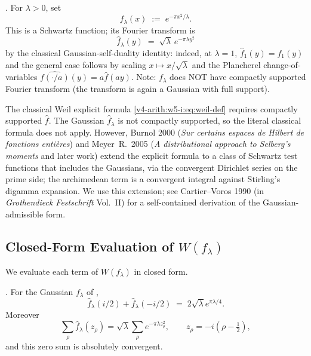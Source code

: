\begin{definition}
\label{v4-arith:w5-i:def:gaussian-family}
\ClaimStatusDefinitional. For \(\lambda>0\), set
\begin{equation}
\label{v4-arith:w5-i:eq:f-lambda}
f_{\lambda}(x)\;:=\;e^{-\pi x^{2}/\lambda}.
\end{equation}
This is a Schwartz function; its Fourier transform is
\begin{equation}
\label{v4-arith:w5-i:eq:f-lambda-hat}
\widehat{f}_{\lambda}(y)\;=\;\sqrt{\lambda}\,e^{-\pi\lambda y^{2}}
\end{equation}
by the classical Gaussian-self-duality identity: indeed, at
\(\lambda=1\), \(\widehat{f}_{1}(y)=f_{1}(y)\) and the general case
follows by scaling \(x\mapsto x/\sqrt{\lambda}\) and the Plancherel
change-of-variables \(\widehat{f(\cdot/a)}(y)=a\widehat{f}(ay)\).
Note: \(f_{\lambda}\) does NOT have compactly supported Fourier
transform (the transform is again a Gaussian with full support).
\end{definition}

\begin{remark}
\label{v4-arith:w5-i:rem:gauss-admissibility}
The classical Weil explicit formula \eqref{v4-arith:w5-i:eq:weil-def}
requires compactly supported \(\widehat{f}\). The Gaussian
\(\widehat{f}_{\lambda}\) is not compactly supported, so the literal
classical formula does not apply. However, Burnol 2000
(\emph{Sur certains espaces de Hilbert de fonctions enti\`eres}) and
Meyer~R.~2005 (\emph{A distributional approach to Selberg's moments}
and later work) extend the explicit formula to a class of Schwartz
test functions that includes the Gaussians, via the convergent
Dirichlet series on the prime side; the archimedean term is a
convergent integral against Stirling's digamma expansion. We use this
extension; see Cartier--Voros 1990 (in \emph{Grothendieck
Festschrift} Vol.~II) for a self-contained derivation of the
Gaussian-admissible form.
\end{remark}

\subsection{Closed-Form Evaluation of \(W(f_{\lambda})\)}
\label{v4-arith:w5-i:weil-gauss-closed-form}

We evaluate each term of \(W(f_{\lambda})\) in closed form.

\begin{lemma}
\label{v4-arith:w5-i:lem:pole-zero}
\ClaimStatusProvedHere. For the Gaussian \(f_{\lambda}\) of
,
\begin{equation}
\label{v4-arith:w5-i:eq:pole-zero}
\widehat{f}_{\lambda}(i/2)+\widehat{f}_{\lambda}(-i/2)\;=\;2\sqrt{\lambda}e^{\pi\lambda/4}.
\end{equation}
Moreover
\[
\sum_{\rho}\widehat{f}_{\lambda}(z_{\rho})
=\sqrt{\lambda}\sum_{\rho}e^{-\pi\lambda z_{\rho}^{2}},
\qquad z_{\rho}=-i(\rho-\tfrac12),
\]
and this zero sum is absolutely convergent.
\end{lemma}

